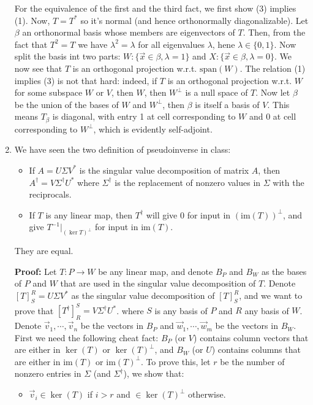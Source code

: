 \documentclass[11pt]{article}
\newcommand{\Span}{\mathrm{span}}
\newcommand{\im}{\text{im}}
\begin{document}
\begin{enumerate}
For the equivalence of the first and the third fact, we first show (3) implies (1). 
Now, $T=T^*$ so it's normal (and hence orthonormally diagonalizable). 
Let $\beta$ an orthonormal basis whose members are eigenvectors of $T$. 
Then, from the fact that $T^2=T$ we have $\lambda^2=\lambda$ for all eigenvalues $\lambda$, 
hene $\lambda\in\{0, 1\}$. 
Now split the basis int two parts: $W:\{\vec{x}\in\beta, \lambda=1\}$ and $X:\{\vec{x}\in\beta, \lambda=0\}.$ 
We now see that $T$ is an orthogonal projection w.r.t. $\Span(W)$. 
The relation (1) implies (3) is not that hard: indeed, if $T$ is an orthogonal projection w.r.t. $W$ for some subspace $W$ or $V$, then $W$, then $W^{\perp}$ is a null space of $T$. 
Now let $\beta$ be the union of the bases of $W$ and $W^{\perp}$, then $\beta$ is itself a basis of $V$. 
This means $T_\beta$ is diagonal, with entry 1 at cell corresponding to $W$ and 0 at cell corresponding to $W^{\perp}$, which is evidently self-adjoint. 

\item We have seen the two definition of pseudoinverse in class: 
\begin{itemize}
\item If $A=U\Sigma V^*$ is the singular value decomposition of matrix $A$, then $A^\dagger=V\Sigma^\dagger U^*$ where $\Sigma^\dagger$ is the replacement of nonzero values in $\Sigma$ with the reciprocals. 

\item If $T$ is any linear map, then $T^\dagger$ will give 0 for input in $(\im (T))^\perp$, and give $T^{-1}|_{(\ker T)^\perp}$ for input in $\im (T)$. 
\end{itemize}
They are equal. 

\textbf{Proof: }
Let $T:P\to W$ be any linear map, 
and denote $B_P$ and $B_W$ as the bases of $P$ and $W$ that are used in the singular value decomposition of $T$. 
Denote $[T]_S^R=U\Sigma V^*
$
as the singular value decomposition of $[T]_S^R$, and we want to prove that 
$[T^\dagger]_R^S=V\Sigma^\dagger U^*$. 
where $S$ is any basis of $P$ and $R$ any basis of $W$. 
Denote $\vec{v}_1, \cdots , \vec{v}_n$ be the vectors in $B_P$ and $\vec{w}_1, \cdots , \vec{w}_m$ be the vectors in $B_W$. 
First we need the following cheat fact: 
$B_P$ (or $V$) contains column vectors that are either in $\ker (T)$ or $\ker (T)^\perp$, and 
$B_W$ (or $U$) contains columns that are either in $\im (T)$ or $\im(T)^\perp$. 
To prove this,  let $r$ be the number of nonzero entries in $\Sigma$ (and $\Sigma^\dagger$), we show that: 
\begin{itemize}
\item $\vec{v}_i\in \ker (T)$ if $i>r$ and $\in\ker (T)^\perp$ otherwise. 


\end{itemize}
\end{enumerate}
\end{document}
